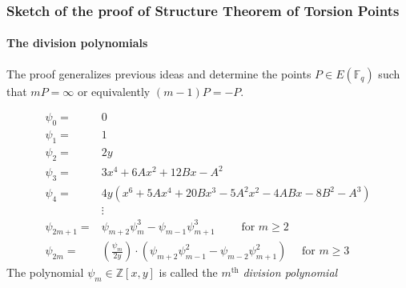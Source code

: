 \documentclass[10pt,handout]{beamer} %
\newcommand{\F}{\mathbb F}
\theoremstyle{definition}
\begin{document}
\begin{frame}\frametitle{Sketch of the proof of Structure Theorem of Torsion Points}
\framesubtitle{The division polynomials}\pause

The proof generalizes previous ideas and determine the points $P\in E(\F_q)$ such that
$mP=\infty$ or equivalently $(m-1)P=-P$.


\begin{Definition}[Division Polynomials of $E:y^2=x^3+Ax+B$ ($p>3$)]\vspace*{-0.7cm}
\begin{align*}
        \psi_{0} =& 0\\
        \psi_{1} =& 1\\
        \psi_{2} =& 2y\\
        \psi_{3} =& 3x^{4} + 6Ax^{2} + 12Bx - A^{2}\\
        \psi_{4} =& 4y(x^{6} + 5Ax^{4} + 20Bx^{3} - 5A^{2}x^{2} - 4ABx - 8B^{2} - A^{3}) \\
        &\vdots\\
        \psi_{2m+1} =& \psi_{m+2}\psi_{m}^{3}-\psi_{m-1}\psi^{3}_{m+1} \qquad \text{ for } m \geq 2\\
        \psi_{2m}  =& \left(\frac{\psi_{m}}{2y}\right)\cdot(\psi_{m+2}\psi^{2}_{m-1}-\psi_{m-2}\psi^{2}_{m+1}) \quad \text{ for } m \geq 3
\end{align*}
The polynomial $\psi_m\in{\mathbb Z}[x,y]$ is called the $m^{\text{th}}$ \emph{division polynomial}
\end{Definition}

\end{frame}
\end{document}
